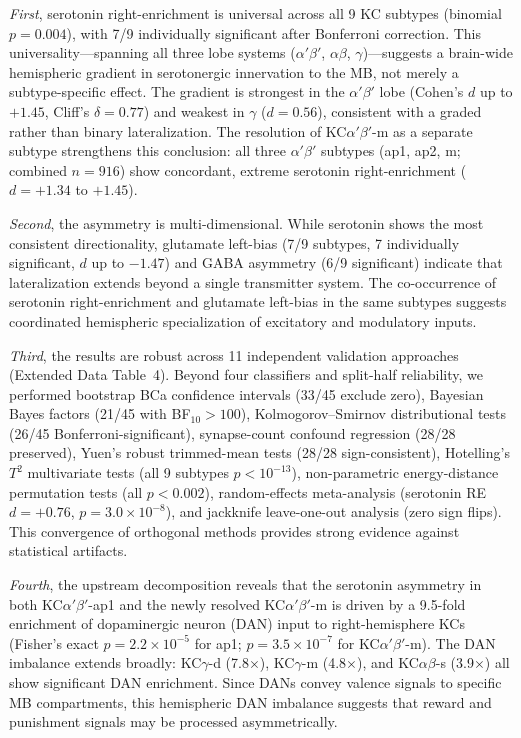 \documentclass[10pt]{article}
\begin{document}
\textit{First}, serotonin right-enrichment is universal across all 9 KC subtypes (binomial $p = 0.004$), with 7/9 individually significant after Bonferroni correction. This universality---spanning all three lobe systems ($\alpha'\beta'$, $\alpha\beta$, $\gamma$)---suggests a brain-wide hemispheric gradient in serotonergic innervation to the MB, not merely a subtype-specific effect. The gradient is strongest in the $\alpha'\beta'$ lobe (Cohen's $d$ up to $+1.45$, Cliff's $\delta = 0.77$) and weakest in $\gamma$ ($d = 0.56$), consistent with a graded rather than binary lateralization. The resolution of KC$\alpha'\beta'$-m as a separate subtype strengthens this conclusion: all three $\alpha'\beta'$ subtypes (ap1, ap2, m; combined $n = 916$) show concordant, extreme serotonin right-enrichment ($d = +1.34$ to $+1.45$).

\textit{Second}, the asymmetry is multi-dimensional. While serotonin shows the most consistent directionality, glutamate left-bias (7/9 subtypes, 7 individually significant, $d$ up to $-1.47$) and GABA asymmetry (6/9 significant) indicate that lateralization extends beyond a single transmitter system. The co-occurrence of serotonin right-enrichment and glutamate left-bias in the same subtypes suggests coordinated hemispheric specialization of excitatory and modulatory inputs.

\textit{Third}, the results are robust across 11 independent validation approaches (Extended Data Table~4). Beyond four classifiers and split-half reliability, we performed bootstrap BCa confidence intervals (33/45 exclude zero), Bayesian Bayes factors (21/45 with BF$_{10} > 100$), Kolmogorov--Smirnov distributional tests (26/45 Bonferroni-significant), synapse-count confound regression (28/28 preserved), Yuen's robust trimmed-mean tests (28/28 sign-consistent), Hotelling's $T^2$ multivariate tests (all 9 subtypes $p < 10^{-13}$), non-parametric energy-distance permutation tests (all $p < 0.002$), random-effects meta-analysis (serotonin RE $d = +0.76$, $p = 3.0 \times 10^{-8}$), and jackknife leave-one-out analysis (zero sign flips). This convergence of orthogonal methods provides strong evidence against statistical artifacts.

\textit{Fourth}, the upstream decomposition reveals that the serotonin asymmetry in both KC$\alpha'\beta'$-ap1 and the newly resolved KC$\alpha'\beta'$-m is driven by a 9.5-fold enrichment of dopaminergic neuron (DAN) input to right-hemisphere KCs (Fisher's exact $p = 2.2 \times 10^{-5}$ for ap1; $p = 3.5 \times 10^{-7}$ for KC$\alpha'\beta'$-m). The DAN imbalance extends broadly: KC$\gamma$-d (7.8$\times$), KC$\gamma$-m (4.8$\times$), and KC$\alpha\beta$-s (3.9$\times$) all show significant DAN enrichment. Since DANs convey valence signals to specific MB compartments\cite{aso2014mushroom,modi2020dopamine_kc}, this hemispheric DAN imbalance suggests that reward and punishment signals may be processed asymmetrically.
\end{document}
